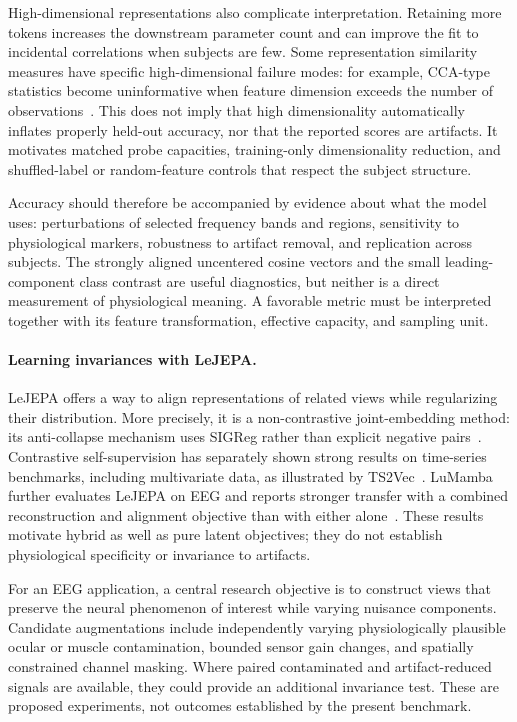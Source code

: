 \documentclass{article}
\begin{document}
High-dimensional representations also complicate interpretation. Retaining
more tokens increases the downstream parameter count and can improve the
fit to incidental correlations when subjects are few. Some representation
similarity measures have specific high-dimensional failure modes: for
example, CCA-type statistics become uninformative when feature dimension
exceeds the number of observations~\cite{kornblith2019similarity}. This does
not imply that high dimensionality automatically inflates properly held-out
accuracy, nor that the reported scores are artifacts. It motivates matched
probe capacities, training-only dimensionality reduction, and shuffled-label
or random-feature controls that respect the subject structure.

Accuracy should therefore be accompanied by evidence about what the model
uses: perturbations of selected frequency bands and regions, sensitivity
to physiological markers, robustness to artifact removal, and replication
across subjects. The strongly aligned uncentered cosine vectors and the
small leading-component class contrast are useful diagnostics, but neither
is a direct measurement of physiological meaning. A favorable metric must
be interpreted together with its feature transformation, effective capacity,
and sampling unit.

\paragraph{Learning invariances with LeJEPA.}
LeJEPA offers a way to align representations of related views while
regularizing their distribution. More precisely, it is a non-contrastive
joint-embedding method: its anti-collapse mechanism uses SIGReg rather
than explicit negative pairs~\cite{balestriero2025lejepa}. Contrastive
self-supervision has separately shown strong results on time-series
benchmarks, including multivariate data, as illustrated by
TS2Vec~\cite{yue2022ts2vec}. LuMamba further evaluates LeJEPA on EEG and reports stronger transfer
with a combined reconstruction and alignment objective than with either
alone~\cite{broustail2026lumamba}. These results motivate hybrid as well as
pure latent objectives; they do not establish physiological specificity
or invariance to artifacts.

For an EEG application, a central research objective is to construct views
that preserve the neural phenomenon of interest while varying nuisance
components. Candidate augmentations include independently varying
physiologically plausible ocular or muscle contamination, bounded sensor
gain changes, and spatially constrained channel masking. Where paired
contaminated and artifact-reduced signals are available, they could provide
an additional invariance test. These are proposed experiments, not outcomes
established by the present benchmark.
\end{document}
